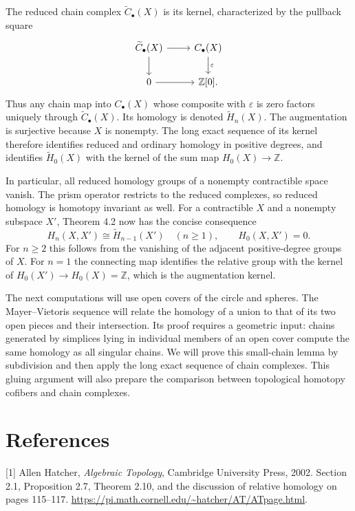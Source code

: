 \documentclass[11pt]{article}
\begin{document}
The reduced chain complex $\widetilde C_\bullet(X)$ is its kernel, characterized by the pullback square
\[
\begin{tikzcd}
\widetilde C_\bullet(X)\arrow[r]\arrow[d]&C_\bullet(X)\arrow[d,"\varepsilon"]\\
0\arrow[r]&\mathbb Z[0].
\end{tikzcd}
\]
Thus any chain map into $C_\bullet(X)$ whose composite with $\varepsilon$ is zero factors uniquely through $\widetilde C_\bullet(X)$. Its homology is denoted $\widetilde H_n(X)$. The augmentation is surjective because $X$ is nonempty. The long exact sequence of its kernel therefore identifies reduced and ordinary homology in positive degrees, and identifies $\widetilde H_0(X)$ with the kernel of the sum map $H_0(X)\to\mathbb Z$.

In particular, all reduced homology groups of a nonempty contractible space vanish. The prism operator restricts to the reduced complexes, so reduced homology is homotopy invariant as well. For a contractible $X$ and a nonempty subspace $X'$, Theorem 4.2 now has the concise consequence
\[H_n(X,X')\cong\widetilde H_{n-1}(X')\quad(n\ge1),\qquad H_0(X,X')=0.\]
For $n\ge2$ this follows from the vanishing of the adjacent positive-degree groups of $X$. For $n=1$ the connecting map identifies the relative group with the kernel of $H_0(X')\to H_0(X)=\mathbb Z$, which is the augmentation kernel.

The next computations will use open covers of the circle and spheres. The Mayer--Vietoris sequence will relate the homology of a union to that of its two open pieces and their intersection. Its proof requires a geometric input: chains generated by simplices lying in individual members of an open cover compute the same homology as all singular chains. We will prove this small-chain lemma by subdivision and then apply the long exact sequence of chain complexes. This gluing argument will also prepare the comparison between topological homotopy cofibers and chain complexes.

\section*{References}
[1] Allen Hatcher, \textit{Algebraic Topology}, Cambridge University Press, 2002. Section 2.1, Proposition 2.7, Theorem 2.10, and the discussion of relative homology on pages 115--117. \url{https://pi.math.cornell.edu/~hatcher/AT/ATpage.html}.
\end{document}
